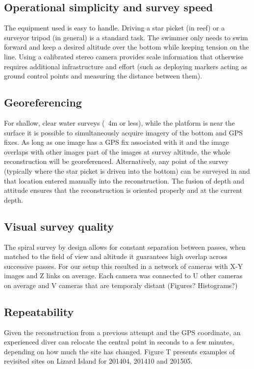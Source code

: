 \subsection{Operational simplicity and survey speed}
The equipment used is easy to handle. Driving a star picket (in reef) or a surveyor tripod (in general) is a standard task. The swimmer only needs to swim forward and keep a desired altitude over the bottom while keeping tension on the line. 
Using a calibrated stereo camera provides scale information that otherwise requires additional infrastructure and effort (such as deploying markers acting as ground control points and measuring the distance between them).

\subsection{Georeferencing}
For shallow, clear water surveys (~4m or less), while the platform is near the surface it is possible to simultaneously acquire imagery of the bottom and GPS fixes. As long as one image has a GPS fix associated with it and the image overlaps with other images part of the images at survey altitude, the whole reconstruction will be georeferenced. Alternatively, any point of the survey (typically where the star picket is driven into the bottom) can be surveyed in and that location entered manually into the reconstruction.  
The fusion of depth and attitude ensures that the reconstruction is oriented properly and at the current depth.

\subsection{Visual survey quality}
The spiral survey by design allows for constant separation between passes, when matched to the field of view and altitude it guarantees high overlap across successive passes. For our setup this resulted in a network of cameras with X-Y images and Z links on average. Each camera was connected to U other cameras on average and V cameras that are temporaly distant (Figures? Histograms?)

\subsection{Repeatability}
Given the reconstruction from a previous attempt and the GPS coordinate, an experienced diver can relocate the central point in seconds to a few minutes, depending on how much the site has changed.
Figure T presents examples of revisited sites on Lizard Island for 201404, 201410 and 201505.


    
  